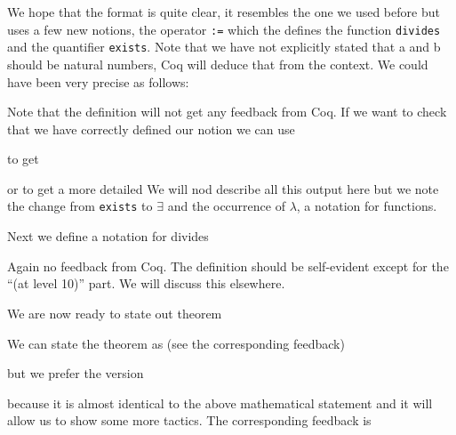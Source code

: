 We hope that the format is quite clear, it resembles the one we used before but uses a few new notions, the operator \texttt{:=}
 which the defines the function \texttt{divides} and the quantifier \texttt{exists}. Note that we have not explicitly stated that a and b should be natural numbers, Coq will deduce that from the context. We could have been very precise as follows:

Note that the definition will not get any feedback from Coq. If we want to check that we have correctly defined our notion we can use

to get

     
or
to get a more detailed 
We will nod describe all this output here but we note the change from \texttt{exists} to $\exists$ and the occurrence of $\lambda$, a notation for functions.


Next we define a notation for divides


Again no feedback from Coq. The definition should be self-evident except for the ``(at level 10)'' part. We will discuss this elsewhere.

We are now ready to state out theorem

We can state the theorem as (see the corresponding feedback)



but we prefer the version

because it is  almost identical to the above mathematical statement and it will allow us to show some more tactics. The corresponding feedback is

